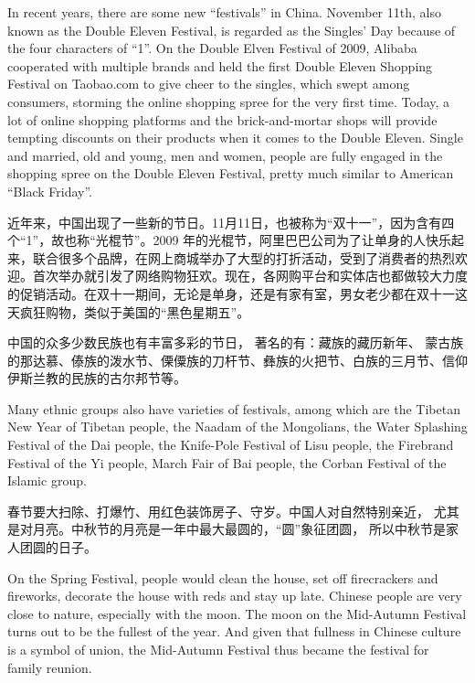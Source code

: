 \begin{part}{}{}
    In recent years, there are some new “festivals” in China. November 11th, also known as the Double Eleven Festival, is regarded as the Singles' Day because of the four characters of “1”. On the Double Elven Festival of 2009, Alibaba cooperated with multiple brands and held the first Double Eleven Shopping Festival on Taobao.com to give cheer to the singles, which swept among consumers, storming the online shopping spree for the very first time. Today, a lot of online shopping platforms and the brick-and-mortar shops will provide tempting discounts on their products when it comes to the Double Eleven. Single and married, old and young, men and women, people are fully engaged in the shopping spree on the Double Eleven Festival, pretty much similar to American “Black Friday”.

    近年来，中国出现了一些新的节日。11月11日，也被称为“双十一”，因为含有四个“1”，故也称“光棍节”。2009 年的光棍节，阿里巴巴公司为了让单身的人快乐起来，联合很多个品牌，在网上商城举办了大型的打折活动，受到了消费者的热烈欢迎。首次举办就引发了网络购物狂欢。现在，各网购平台和实体店也都做较大力度的促销活动。在双十一期间，无论是单身，还是有家有室，男女老少都在双十一这天疯狂购物，类似于美国的“黑色星期五”。
\end{part}

\begin{part}{}{}
    中国的众多少数民族也有丰富多彩的节日， 著名的有：藏族的藏历新年、 蒙古族的那达慕、傣族的泼水节、傈僳族的刀杆节、彝族的火把节、白族的三月节、信仰伊斯兰教的民族的古尔邦节等。

    Many ethnic groups also have varieties of festivals, among which are the Tibetan New Year of Tibetan people, the Naadam of the Mongolians, the Water Splashing Festival of the Dai people, the Knife-Pole Festival of Lisu people, the Firebrand Festival of the Yi people, March Fair of Bai people, the Corban Festival of the Islamic group.
\end{part}

\begin{part}{}{}
    春节要大扫除、打爆竹、用红色装饰房子、守岁。中国人对自然特别亲近， 尤其是对月亮。中秋节的月亮是一年中最大最圆的，“圆”象征团圆， 所以中秋节是家人团圆的日子。

    On the Spring Festival, people would clean the house, set off firecrackers and fireworks, decorate the house with reds and stay up late. Chinese people are very close to nature, especially with the moon. The moon on the Mid-Autumn Festival turns out to be the fullest of the year. And given that fullness in Chinese culture is a symbol of union, the Mid-Autumn Festival thus became the festival for family reunion.
\end{part}

